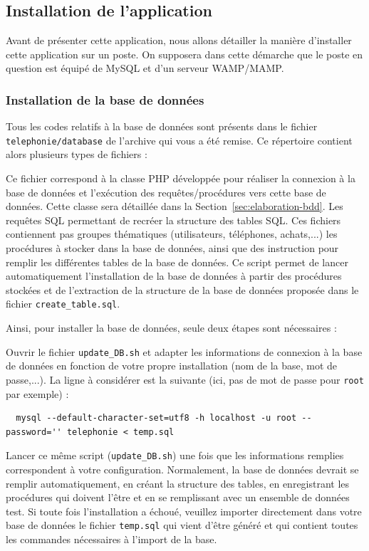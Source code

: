 \subsection{Installation de l'application}
Avant de présenter cette application, nous allons détailler la manière d'installer cette application sur un poste. On supposera dans cette démarche que le poste en question est équipé de MySQL et d'un serveur WAMP/MAMP.

\subsubsection{Installation de la base de données}
Tous les codes relatifs à la base de données sont présents dans le fichier \texttt{telephonie/database} de l'archive qui vous a été remise. Ce répertoire contient alors plusieurs types de fichiers :
\begin{itemize}
  Ce fichier correspond à la classe PHP développée pour réaliser la connexion à la base de données et l'exécution des requêtes/procédures vers cette base de données. Cette classe sera détaillée dans la Section~\ref{sec:elaboration-bdd}.
  Les requêtes SQL permettant de recréer la structure des tables SQL.
  Ces fichiers contiennent pas groupes thématiques (utilisateurs, téléphones, achats,...) les procédures à stocker dans la base de données, ainsi que des instruction pour remplir les différentes tables de la base de données.
  Ce script permet de lancer \og automatiquement\fg{} l'installation de la base de données à partir des procédures stockées et de l'extraction de la structure de la base de données proposée dans le fichier \texttt{create\_table.sql}.
\end{itemize}

Ainsi, pour installer la base de données, seule deux étapes sont nécessaires :
\begin{itemize}
  Ouvrir le fichier \texttt{update\_DB.sh} et adapter les informations de connexion à la base de données en fonction de votre propre installation (nom de la base, mot de passe,...). La ligne à considérer est la suivante (ici, pas de mot de passe pour \texttt{root} par exemple) :
\begin{lstlisting}
  mysql --default-character-set=utf8 -h localhost -u root --password='' telephonie < temp.sql
\end{lstlisting}
  Lancer ce même script (\texttt{update\_DB.sh}) une fois que les informations remplies correspondent à votre configuration. Normalement, la base de données devrait se remplir automatiquement, en créant la structure des tables, en enregistrant les procédures qui doivent l'être et en se remplissant avec un ensemble de données test. Si toute fois l'installation a échoué, veuillez importer directement dans votre base de données le fichier \texttt{temp.sql} qui vient d'être généré et qui contient toutes les commandes nécessaires à l'import de la base.
\end{itemize}

